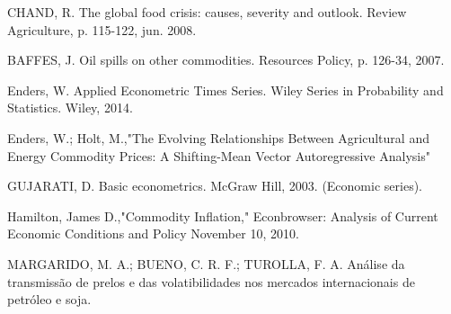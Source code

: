 \documentclass[a4paper,12pt,oneside,titlepage]{article}
\begin{document}
\item{CHAND, R. The global food
	crisis: causes, severity and
	outlook. Review Agriculture,
	p. 115-122, jun. 2008.}
\item{BAFFES, J. Oil spills on other
	commodities. Resources Policy,
	p. 126-34, 2007.}	
\item{Enders, W. Applied Econometric Times Series. Wiley Series in Probability and Statistics. Wiley,
2014.}
\item{Enders, W.; Holt, M.,"The Evolving Relationships Between Agricultural and Energy Commodity Prices: A Shifting-Mean Vector Autoregressive Analysis"}
\item{GUJARATI, D. Basic econometrics. McGraw Hill, 2003. (Economic series).}
\item{
	
	Hamilton, James D.,"Commodity Inflation," Econbrowser: Analysis of Current Economic Conditions and Policy November 10, 2010.}
\item{MARGARIDO, M. A.; BUENO, C.
	R. F.; TUROLLA, F. A. Análise
	da transmissão de prelos e das
	volatibilidades nos mercados
	internacionais de petróleo e
	soja.}
			
\end{document}
